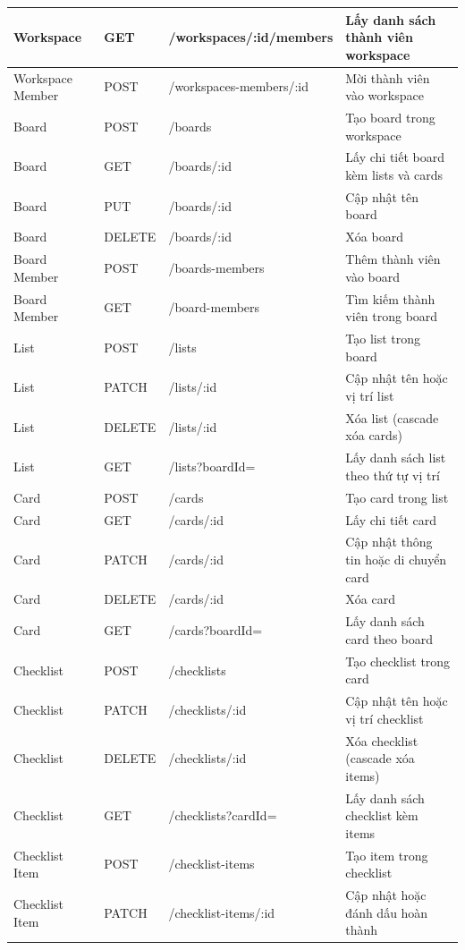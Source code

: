 \begin{longtable}{|l|l|p{5.5cm}|p{4.5cm}|}
\hline
Workspace & GET & /workspaces/:id/members & Lấy danh sách thành viên workspace \\
\hline
Workspace Member & POST & /workspaces-members/:id & Mời thành viên vào workspace \\
\hline
Board & POST & /boards & Tạo board trong workspace \\
\hline
Board & GET & /boards/:id & Lấy chi tiết board kèm lists và cards \\
\hline
Board & PUT & /boards/:id & Cập nhật tên board \\
\hline
Board & DELETE & /boards/:id & Xóa board \\
\hline
Board Member & POST & /boards-members & Thêm thành viên vào board \\
\hline
Board Member & GET & /board-members & Tìm kiếm thành viên trong board \\
\hline
List & POST & /lists & Tạo list trong board \\
\hline
List & PATCH & /lists/:id & Cập nhật tên hoặc vị trí list \\
\hline
List & DELETE & /lists/:id & Xóa list (cascade xóa cards) \\
\hline
List & GET & /lists?boardId= & Lấy danh sách list theo thứ tự vị trí \\
\hline
Card & POST & /cards & Tạo card trong list \\
\hline
Card & GET & /cards/:id & Lấy chi tiết card \\
\hline
Card & PATCH & /cards/:id & Cập nhật thông tin hoặc di chuyển card \\
\hline
Card & DELETE & /cards/:id & Xóa card \\
\hline
Card & GET & /cards?boardId= & Lấy danh sách card theo board \\
\hline
Checklist & POST & /checklists & Tạo checklist trong card \\
\hline
Checklist & PATCH & /checklists/:id & Cập nhật tên hoặc vị trí checklist \\
\hline
Checklist & DELETE & /checklists/:id & Xóa checklist (cascade xóa items) \\
\hline
Checklist & GET & /checklists?cardId= & Lấy danh sách checklist kèm items \\
\hline
Checklist Item & POST & /checklist-items & Tạo item trong checklist \\
\hline
Checklist Item & PATCH & /checklist-items/:id & Cập nhật hoặc đánh dấu hoàn thành \\

\end{longtable}
